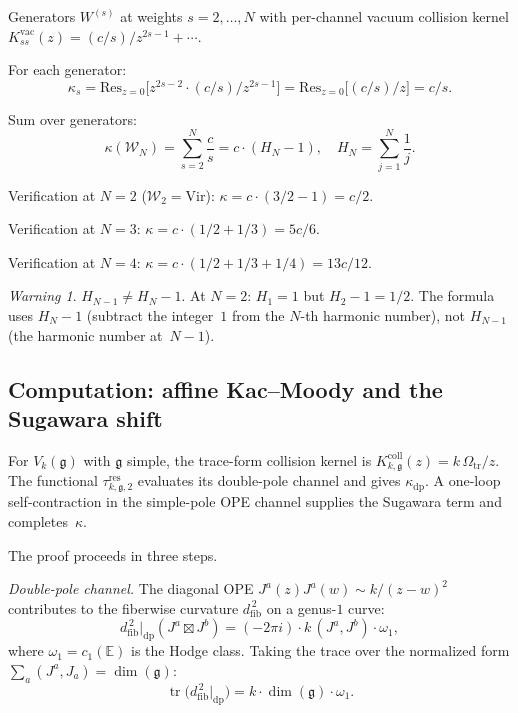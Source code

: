 \documentclass[11pt,reqno]{amsart}
\theoremstyle{definition}
\theoremstyle{remark}
\newtheorem{warning}[theorem]{Warning}
\newcommand{\cW}{\mathcal{W}}
\newcommand{\fg}{\mathfrak{g}}
\newcommand{\Res}{\mathrm{Res}}
\newcommand{\Vir}{\mathrm{Vir}}
\newcommand{\dfib}{d_{\mathrm{fib}}}
\DeclareMathOperator{\tr}{tr}
\numberwithin{equation}{section}
\begin{document}
Generators $W^{(s)}$ at weights $s = 2,\ldots,N$ with
per-channel vacuum collision kernel
$K_{ss}^{\mathrm{vac}}(z)=(c/s)/z^{2s-1}+\cdots$.

For each generator:
\[
\kappa_s = \Res_{z=0}\bigl[z^{2s-2}\cdot
 (c/s)/z^{2s-1}\bigr]
= \Res_{z=0}\bigl[(c/s)/z\bigr] = c/s.
\]

Sum over generators:
\begin{equation}\label{eq:kappa-wn}
\boxed{\;\kappa(\cW_N) = \sum_{s=2}^{N}\frac{c}{s}
 = c\cdot(H_N - 1),\quad
 H_N = \sum_{j=1}^{N}\frac{1}{j}.\;}
\end{equation}

Verification at $N=2$ ($\cW_2 = \Vir$):
$\kappa = c\cdot(3/2 - 1) = c/2$.

Verification at $N=3$:
$\kappa = c\cdot(1/2 + 1/3) = 5c/6$.

Verification at $N=4$:
$\kappa = c\cdot(1/2 + 1/3 + 1/4) = 13c/12$.

\begin{warning}\label{warn:harmonic}
$H_{N-1} \neq H_N - 1$. At $N = 2$: $H_1 = 1$ but
$H_2 - 1 = 1/2$. The formula uses $H_N - 1$ (subtract the
integer~$1$ from the $N$-th harmonic number), not $H_{N-1}$
(the harmonic number at~$N-1$).
\end{warning}

\subsection{Computation: affine Kac--Moody and the
Sugawara shift}\label{subsec:av-km}

For $V_k(\fg)$ with $\fg$ simple, the trace-form collision kernel is
$K_{k,\fg}^{\mathrm{coll}}(z)=k\,\Omega_{\mathrm{tr}}/z$.
The functional $\tau_{k,\fg,2}^{\mathrm{res}}$ evaluates its
double-pole channel and gives $\kappa_{\mathrm{dp}}$.  A one-loop
self-contraction in the simple-pole OPE channel supplies the Sugawara
term and completes~$\kappa$.

The proof proceeds in three steps.

\medskip\noindent
\emph{Double-pole channel.}
The diagonal OPE $J^a(z)J^a(w) \sim k/(z-w)^2$ contributes
to the fiberwise curvature $\dfib^{\,2}$ on a genus-$1$ curve:
\begin{equation}\label{eq:dp-channel}
\dfib^{\,2}\big|_{\mathrm{dp}}(J^a \boxtimes J^b)
= (-2\pi i)\cdot k\,(J^a,J^b)\cdot\omega_1,
\end{equation}
where $\omega_1 = c_1(\mathbb{E})$ is the Hodge class.
Taking the trace over the normalized form $\sum_a(J^a,J_a)
= \dim(\fg)$:
\begin{equation}\label{eq:dp-trace}
\tr\bigl(\dfib^{\,2}\big|_{\mathrm{dp}}\bigr)
= k\cdot\dim(\fg)\cdot\omega_1.
\end{equation}
\end{document}
